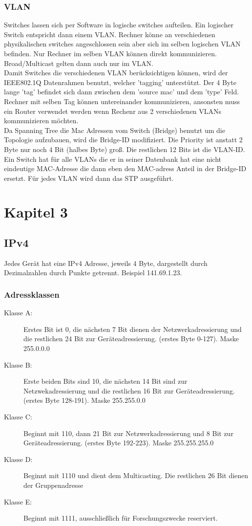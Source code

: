 \documentclass[a4paper,10pt]{scrartcl}
\begin{document}
        \subsubsection{VLAN}
            Switches lassen sich per Software in logische switches aufteilen. Ein logischer Switch  entspricht dann einem VLAN.
            Rechner könne an verschiedenen physikalischen switches angeschlossen sein aber sich im selben logischen VLAN befinden.
            Nur Rechner im selben VLAN können direkt kommunizieren. Broad/Multicast gelten dann auch nur im VLAN. \\
            Damit Switches die verschiedenen VLAN berücksichtigen können, wird der IEEE802.1Q Datenrahmen benutzt, welcher 'tagging' unterstützt. Der 4 Byte lange 'tag' befindet
            sich dann zwischen dem 'source mac' und dem 'type' Feld. Rechner mit selben Tag können untereinander kommunizieren, ansonsten muss ein Router verwendet werden wenn Rechenr aus 
            2 verschiedenen VLANs kommunizieren möchten. \\
            Da Spanning Tree die Mac Adressen vom Switch (Bridge) benutzt um die Topologie aufzubauen, wird die Bridge-ID modifiziert. Die Priority ist anstatt 2 Byte nur noch 4 Bit 
            (halbes Byte) groß. Die restlichen 12 Bits ist die VLAN-ID. Ein Switch hat für alle VLANs die er in seiner Datenbank hat eine nicht eindeutige MAC-Adresse die dann eben den 
            MAC-adress Anteil in der Bridge-ID ersetzt. Für jedes VLAN wird dann das STP ausgeführt.
       \newpage
\section{Kapitel 3}
    \subsection{IPv4}
    Jedes Gerät hat eine IPv4 Adresse, jeweils 4 Byte, dargestellt durch Dezimalzahlen durch Punkte getrennt. Beispiel 141.69.1.23. 
    \subsubsection{Adressklassen}
    \begin{description}
        \item[Klasse A:] Erstes Bit ist 0, die nächsten 7 Bit dienen der Netzwerkadressierung und die restlichen 24 Bit zur Geräteadressierung. (erstes Byte 0-127). Maske 255.0.0.0
        \item[Klasse B:] Erste beiden Bits sind 10, die nächsten 14 Bit sind zur Netzwekadressierung und die restlichen 16 Bit zur Geräteadressierung. (erstes Byte 128-191). Maske 255.255.0.0
        \item[Klasse C:] Beginnt mit 110, dann 21 Bit zur Netzwerkadressierung und 8 Bit zur Geräteadressierung. (erstes Byte 192-223). Maske 255.255.255.0
        \item[Klasse D:] Beginnt mit 1110 und dient dem Multicasting. Die restlichen 26 Bit dienen der Gruppenadresse
        \item[Klasse E:] Beginnt mit 1111, ausschließlich für Forschungszwecke reserviert.
    \end{description}
\end{document}
